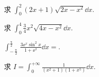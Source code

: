 	\begin{ti}
		求 $\int_{0}^{2} (2x + 1) \sqrt{2x - x^{2}} \dd{x}$.
	\end{ti}

	\begin{ti}
		求 $\int_{0}^{4} \frac{3}{4} x^{2} \sqrt{4x - x^{2}} \dd{x}$.
	\end{ti}

	\begin{ti}
		$\int_{-\frac{\uppi}{2}}^{\frac{\uppi}{2}} \frac{3 \ee^{x} \sin^{2}x}{1 + \ee^{x}} \dd{x} = $\htwo.
	\end{ti}

	\begin{ti}
		求 $I = \int_{0}^{+\infty} \frac{1}{\left( x^{2} + 1 \right) \left( 1 + x^{5} \right)} \dd{x}$.
	\end{ti}